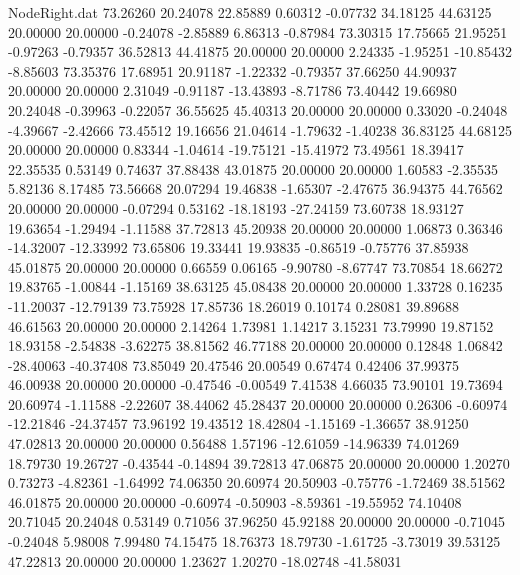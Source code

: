 \begin{filecontents}{NodeRight.dat}
  73.26260   20.24078   22.85889     0.60312   -0.07732   34.18125   44.63125   20.00000   20.00000   -0.24078   -2.85889    6.86313   -0.87984
  73.30315   17.75665   21.95251    -0.97263   -0.79357   36.52813   44.41875   20.00000   20.00000    2.24335   -1.95251  -10.85432   -8.85603
  73.35376   17.68951   20.91187    -1.22332   -0.79357   37.66250   44.90937   20.00000   20.00000    2.31049   -0.91187  -13.43893   -8.71786
  73.40442   19.66980   20.24048    -0.39963   -0.22057   36.55625   45.40313   20.00000   20.00000    0.33020   -0.24048   -4.39667   -2.42666
  73.45512   19.16656   21.04614    -1.79632   -1.40238   36.83125   44.68125   20.00000   20.00000    0.83344   -1.04614  -19.75121  -15.41972
  73.49561   18.39417   22.35535     0.53149    0.74637   37.88438   43.01875   20.00000   20.00000    1.60583   -2.35535    5.82136    8.17485
  73.56668   20.07294   19.46838    -1.65307   -2.47675   36.94375   44.76562   20.00000   20.00000   -0.07294    0.53162  -18.18193  -27.24159
  73.60738   18.93127   19.63654    -1.29494   -1.11588   37.72813   45.20938   20.00000   20.00000    1.06873    0.36346  -14.32007  -12.33992
  73.65806   19.33441   19.93835    -0.86519   -0.75776   37.85938   45.01875   20.00000   20.00000    0.66559    0.06165   -9.90780   -8.67747
  73.70854   18.66272   19.83765    -1.00844   -1.15169   38.63125   45.08438   20.00000   20.00000    1.33728    0.16235  -11.20037  -12.79139
  73.75928   17.85736   18.26019     0.10174    0.28081   39.89688   46.61563   20.00000   20.00000    2.14264    1.73981    1.14217    3.15231
  73.79990   19.87152   18.93158    -2.54838   -3.62275   38.81562   46.77188   20.00000   20.00000    0.12848    1.06842  -28.40063  -40.37408
  73.85049   20.47546   20.00549     0.67474    0.42406   37.99375   46.00938   20.00000   20.00000   -0.47546   -0.00549    7.41538    4.66035
  73.90101   19.73694   20.60974    -1.11588   -2.22607   38.44062   45.28437   20.00000   20.00000    0.26306   -0.60974  -12.21846  -24.37457
  73.96192   19.43512   18.42804    -1.15169   -1.36657   38.91250   47.02813   20.00000   20.00000    0.56488    1.57196  -12.61059  -14.96339
  74.01269   18.79730   19.26727    -0.43544   -0.14894   39.72813   47.06875   20.00000   20.00000    1.20270    0.73273   -4.82361   -1.64992
  74.06350   20.60974   20.50903    -0.75776   -1.72469   38.51562   46.01875   20.00000   20.00000   -0.60974   -0.50903   -8.59361  -19.55952
  74.10408   20.71045   20.24048     0.53149    0.71056   37.96250   45.92188   20.00000   20.00000   -0.71045   -0.24048    5.98008    7.99480
  74.15475   18.76373   18.79730    -1.61725   -3.73019   39.53125   47.22813   20.00000   20.00000    1.23627    1.20270  -18.02748  -41.58031

\end{filecontents}
